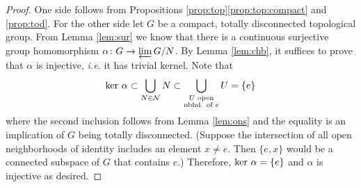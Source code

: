 \documentclass[12pt]{article}
\theoremstyle{definition}
\theoremstyle{remark}
\newcommand*{\nor}{\mathcal{N}}
\begin{document}
    \begin{proof}
        One side follows from Propositions \ref{prop:top}\ref{prop:top:compact} and \ref{prop:tod}. For the other side let $G$ be a compact, totally disconnected topological group. From Lemma \ref{lem:sur} we know that there is a continuous surjective group homomorphism $\alpha\colon G\to\varprojlim G/N$. By Lemma \ref{lem:chb}, it suffices to prove that $\alpha$ is injective, \emph{i.e.} it has trivial kernel. Note that
        $$
        \textup{ker }\alpha \subset \bigcup_{N\in\nor} N \subset \bigcup_{\substack{U \text{ open} \\ \text{nbhd. of } e}} U = \{e\}
        $$
        where the second inclusion follows from Lemma \ref{lem:ons} and the equality is an implication of $G$ being totally disconnected. (Suppose the intersection of all open neighborhoods of identity includes an element $x\neq e$. Then $\{e,x\}$ would be a connected subspace of $G$ that contains $e$.) Therefore, $\textup{ker }\alpha=\{e\}$ and $\alpha$ is injective as desired.
    \end{proof}

    \printbibliography
\end{document}
